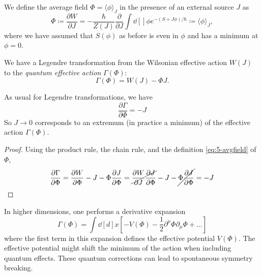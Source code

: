 \begin{definition}[]
  We define the average field $\Phi = \langle \phi \rangle_J$ in the presence of an external source $J$ as
  \begin{equation}
    \label{eq:5-avgfield}
    \Phi \coloneqq \frac{\partial W}{\partial J} = -\frac{\hbar}{Z(J)} \frac{\partial }{\partial J} \int \dd[]{\phi} e^{-(S + J \phi) / \hbar} \coloneqq \langle \phi \rangle_J,
  \end{equation}
  where we have assumed that $S(\phi)$ as before is even in $\phi$ and has a minimum at $\phi = 0$.
\end{definition}
\begin{definition}
  We have a Legendre transformation from the Wilsonian effective action $W(J)$ to the \emph{quantum effective action} $\Gamma(\Phi)$:
  \begin{equation}
    \Gamma(\Phi) = W(J) - \Phi J.
  \end{equation}
\end{definition}
\begin{claim}
  As usual for Legendre transformations, we have  
  \begin{equation}
     \boxed{\frac{\partial \Gamma}{\partial \Phi} = - J}
  \end{equation}
  So $J \to 0$ corresponds to an extremum (in practice a minimum) of the effective action $\Gamma(\Phi)$.
\end{claim}
\begin{proof}
  Using the product rule, the chain rule, and the definition \eqref{eq:5-avgfield} of $\Phi$, 
  \begin{equation}
    \frac{\partial \Gamma}{\partial \Phi} = \frac{\partial W}{\partial \Phi} - J - \Phi \frac{\partial J}{\partial \Phi}
    = \cancel{\frac{\partial W}{\partial J} \frac{\partial J}{\partial \Phi}} - J - \cancel{\Phi \frac{\partial J}{\partial \Phi}}
    = -J
  \end{equation}
\end{proof}

\begin{leftbar}
  In higher dimensions, one performs a derivative expansion
  \begin{equation}
    \Gamma(\Phi) = \int \dd[d]{x} \left[ -V(\Phi) -\frac{1}{2} \partial^{\mu} \Phi \partial_{\mu} \Phi + \dots \right]
  \end{equation}
  where the first term in this expansion defines the effective potential $V(\Phi)$.
  The effective potential might shift the minimum of the action when including quantum effects. These quantum corrections can lead to spontaneous symmetry breaking.
\end{leftbar}

